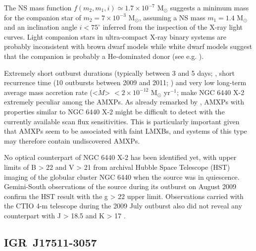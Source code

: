 \documentclass[graybox]{svmult}
\begin{document}
The NS mass function $f(m_2,m_1, i)\simeq 1.7\times 10^{-7}$ M$_\odot$ suggests a minimum mass for the companion star of $m_2=7\times10^{-3}$ M$_\odot$, assuming a NS mass $m_1=1.4$ M$_\odot$ and an inclination angle $i<75^\circ$ inferred from the inspection of the X-ray light curves. Light companion stars in ultra-compact X-ray binary systems are probably inconsistent with brown dwarf models while white dwarf models suggest that the companion is probably a He-dominated donor (see e.g. \cite{Altamirano2010,Krimm2007}).  

Extremely short outburst durations (typically between 3 and 5 days; \cite{Altamirano2010}, short recurrence time (10 outbursts between 2009 and 2011; \cite{Patruno2013}) and very low long-term average mass accretion rate (<$\dot{M}$> $< 2\times10^{-12}$ M$_{\odot}$ yr$^{-1}$; \cite{Heinke2010} make NGC 6440 X-2 extremely peculiar among the AMXPs. As already remarked by \cite{Patruno2012}, AMXPs with properties similar to NGC 6440 X-2 might be difficult to detect with the currently available scan flux sensitivities. This is particularly important given that AMXPs seem to be associated with faint LMXBs, and systems of this type may therefore contain undiscovered AMXPs. 

No optical counterpart of NGC 6440 X-2 has been identified yet, with upper limits of B > 22 and V > 21 from archival Hubble Space Telescope (HST) imaging of the globular cluster NGC 6440 when the source was in quiescence. Gemini-South observations of the source during its outburst on August 2009 confirm the HST result with the g > 22 upper limit. Observations carried with the CTIO 4-m telescope during the 2009 July outburst also did not reveal any counterpart with J > 18.5 and K > 17 \cite{Heinke2010}.



\subsection{IGR~J17511-3057}
\end{document}
